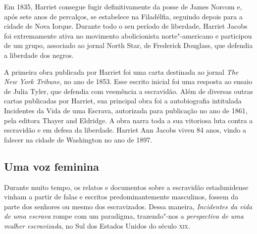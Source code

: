 \documentclass[12pt]{extarticle}
\begin{document}



Em 1835, Harriet consegue fugir definitivamente da posse de James Norcom
e, após sete anos de percalços, se estabelece na Filadélfia, seguindo
depois para a cidade de Nova Iorque. Durante todo o seu período de
liberdade, Harriet Jacobs foi extremamente ativa no movimento
abolicionista norte"-americano e participou de um grupo, associado ao
jornal North Star, de Frederick Douglass, que defendia a liberdade dos
negros.




A primeira obra publicada por Harriet foi uma carta destinada ao jornal
\emph{The New York Tribune}, no ano de 1853. Esse escrito inicial foi
uma resposta ao ensaio de Julia Tyler, que defendia com veemência a
escravidão. Além de diversas outras cartas publicadas por Harriet, sua
principal obra foi a autobiografia intitulada Incidentes da Vida de uma
Escrava, autorizada para publicação no ano de 1861, pela editora Thayer
and Eldridge. A obra narra toda a sua vitoriosa luta contra a escravidão
e em defesa da liberdade. Harriet Ann Jacobs viveu 84 anos, vindo a
falecer na cidade de Washington no ano de 1897.






\subsection{Uma voz feminina}

Durante muito tempo, os relatos e documentos sobre a escravidão
estadunidense vinham a partir de falas e escritos predominantemente
masculinos, fossem da parte dos senhores ou mesmo dos escravizados.
Dessa maneira, \emph{Incidentes da vida de uma escrava} rompe com um
paradigma, trazendo"-nos a \emph{perspectiva de uma mulher
escravizada}, no Sul dos Estados Unidos do século \textsc{xix}.
\end{document}
